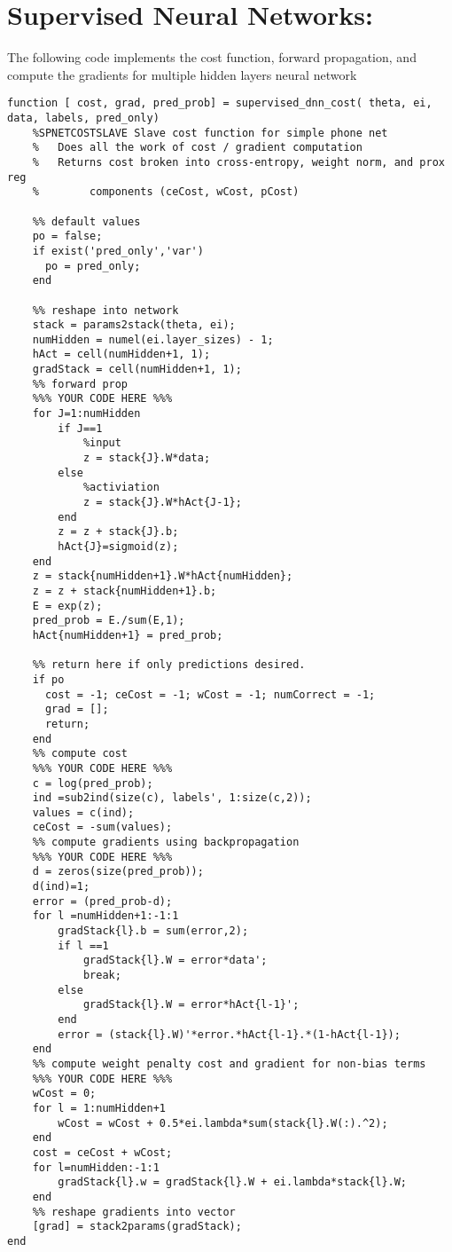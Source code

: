 \documentclass[12pt] {article}
\begin{document}
\newpage

\section*{Supervised Neural Networks:}
The following code implements the cost function, forward propagation, and compute the gradients for multiple hidden layers neural network 


\begin{lstlisting}
function [ cost, grad, pred_prob] = supervised_dnn_cost( theta, ei, data, labels, pred_only)
	%SPNETCOSTSLAVE Slave cost function for simple phone net
	%   Does all the work of cost / gradient computation
	%   Returns cost broken into cross-entropy, weight norm, and prox reg
	%        components (ceCost, wCost, pCost)

	%% default values
	po = false;
	if exist('pred_only','var')
	  po = pred_only;
	end

	%% reshape into network
	stack = params2stack(theta, ei);
	numHidden = numel(ei.layer_sizes) - 1;
	hAct = cell(numHidden+1, 1);
	gradStack = cell(numHidden+1, 1);
	%% forward prop
	%%% YOUR CODE HERE %%%
	for J=1:numHidden
    	if J==1
        	%input
	        z = stack{J}.W*data; 
	    else 
    	    %activiation
	        z = stack{J}.W*hAct{J-1};
    	end
	    z = z + stack{J}.b;
	    hAct{J}=sigmoid(z);
	end
	z = stack{numHidden+1}.W*hAct{numHidden};
	z = z + stack{numHidden+1}.b;
	E = exp(z);
	pred_prob = E./sum(E,1);
	hAct{numHidden+1} = pred_prob;

	%% return here if only predictions desired.
	if po
	  cost = -1; ceCost = -1; wCost = -1; numCorrect = -1;
	  grad = [];  
	  return;
	end
	%% compute cost
	%%% YOUR CODE HERE %%%
	c = log(pred_prob);
	ind =sub2ind(size(c), labels', 1:size(c,2));
	values = c(ind);
	ceCost = -sum(values);
	%% compute gradients using backpropagation
	%%% YOUR CODE HERE %%%
	d = zeros(size(pred_prob));
	d(ind)=1;
	error = (pred_prob-d);
	for l =numHidden+1:-1:1
	    gradStack{l}.b = sum(error,2);
    	if l ==1
        	gradStack{l}.W = error*data';
	        break;
	    else
    	    gradStack{l}.W = error*hAct{l-1}';
	    end
	    error = (stack{l}.W)'*error.*hAct{l-1}.*(1-hAct{l-1});    
	end
	%% compute weight penalty cost and gradient for non-bias terms
	%%% YOUR CODE HERE %%%
	wCost = 0;
	for l = 1:numHidden+1
    	wCost = wCost + 0.5*ei.lambda*sum(stack{l}.W(:).^2);
	end
	cost = ceCost + wCost;
	for l=numHidden:-1:1
    	gradStack{l}.w = gradStack{l}.W + ei.lambda*stack{l}.W;
	end
	%% reshape gradients into vector
	[grad] = stack2params(gradStack);
end
\end{lstlisting}
\end{document}
